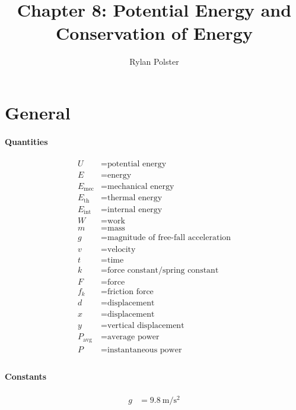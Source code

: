 \documentclass{article}
\title{Chapter 8: Potential Energy and Conservation of Energy}
\author{Rylan Polster}
\begin{document}
    \maketitle
    
    \section*{General}

        \paragraph{Quantities}
        \begin{align}
            U &= \text{potential energy} \nonumber\\
            E &= \text{energy} \nonumber\\
            E_\text{mec} &= \text{mechanical energy} \nonumber\\
            E_\text{th} &= \text{thermal energy} \nonumber\\
            E_\text{int} &= \text{internal energy} \nonumber\\
            W &= \text{work} \nonumber\\
            m &= \text{mass} \nonumber\\
            g &= \text{magnitude of free-fall acceleration} \nonumber\\
            v &= \text{velocity} \nonumber\\
            t &= \text{time} \nonumber\\
            k &= \text{force constant/spring constant} \nonumber\\
            F &= \text{force} \nonumber\\
            f_k &= \text{friction force} \nonumber\\
            d &= \text{displacement} \nonumber\\
            x &= \text{displacement} \nonumber\\
            y &= \text{vertical displacement} \nonumber\\
            P_\text{avg} &= \text{average power} \nonumber\\
            P &= \text{instantaneous power} \nonumber\\
        \end{align}

    \paragraph{Constants}
    \begin{align}
        g &= \SI[per-mode=symbol]{9.8}{\meter\per\square\second} \nonumber
    \end{align}
\end{document}
